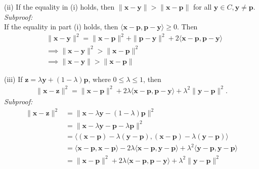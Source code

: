 \documentclass[letterpaper,12pt]{article}
\let\vec\mathbf
\theoremstyle{definition}
\begin{document}
(ii) If the equality in (i) holds, then $\|\vec{x} - \vec{y}\| > \|\vec{x} - \vec{p}\|$ for all $\vec{y} \in C, \vec{y} \neq \vec{p}$. \\
\textit{Subproof:} \\
If the equality in part (i) holds, then $\langle \vec{x} - \vec{p}, \vec{p} - \vec{y} \rangle \geq 0$. Then
\begin{align*}
  &\|\vec{x} - \vec{y}\|^2 = \|\vec{x} - \vec{p}\|^2 + \|\vec{p} - \vec{y}\|^2 + 2 \langle \vec{x} - \vec{p}, \vec{p} - \vec{y} \rangle \\
  &\implies \|\vec{x} - \vec{y}\|^2 > \|\vec{x} - \vec{p}\|^2 \\
  &\implies \|\vec{x} - \vec{y}\| > \|\vec{x} - \vec{p}\|
\end{align*}

(iii) If $\vec{z} = \lambda \vec{y} + (1 - \lambda)\vec{p}$, where $0 \leq \lambda \leq 1$, then
\begin{align*}
  \|\vec{x} - \vec{z}\|^2 = \|\vec{x} - \vec{p}\|^2 + 2\lambda \langle \vec{x} - \vec{p}, \vec{p} - \vec{y} \rangle + \lambda^2 \|\vec{y} - \vec{p}\|^2.
\end{align*}
\textit{Subproof:}
\begin{align*}
  \|\vec{x} - \vec{z}\|^2
  &= \|\vec{x} - \lambda \vec{y} - (1 - \lambda)\vec{p}\|^2 \\
  &= \|\vec{x} - \lambda \vec{y} - \vec{p} - \lambda\vec{p}\|^2 \\
  &= \langle (\vec{x} - \vec{p}) - \lambda (\vec{y} - \vec{p}), (\vec{x} - \vec{p}) - \lambda (\vec{y} - \vec{p}) \rangle \\
  &= \langle \vec{x} - \vec{p}, \vec{x} - \vec{p} \rangle - 2\lambda \langle \vec{x} - \vec{p}, \vec{y} - \vec{p} \rangle + \lambda^2 \langle \vec{y} - \vec{p}, \vec{y} - \vec{p} \rangle \\
  &= \|\vec{x} - \vec{p}\|^2 + 2\lambda \langle \vec{x} - \vec{p}, \vec{p} - \vec{y} \rangle + \lambda^2 \|\vec{y} - \vec{p}\|^2
\end{align*}
\end{document}
